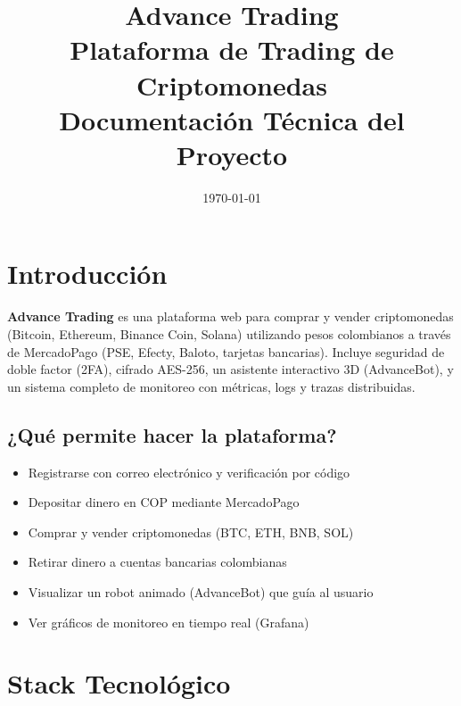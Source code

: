 \documentclass[12pt,oneside]{article}
\title{\color{titlepurple}\Huge\textbf{Advance Trading} \\[0.5cm]
\Large Plataforma de Trading de Criptomonedas \\[0.3cm]
\small Documentación Técnica del Proyecto}
\author{}
\date{\today}
\begin{document}
\maketitle
\thispagestyle{empty}
\newpage

\tableofcontents
\newpage

\section{Introducción}

\textbf{Advance Trading} es una plataforma web para comprar y vender criptomonedas (Bitcoin, Ethereum, Binance Coin, Solana) utilizando pesos colombianos a través de MercadoPago (PSE, Efecty, Baloto, tarjetas bancarias). Incluye seguridad de doble factor (2FA), cifrado AES-256, un asistente interactivo 3D (AdvanceBot), y un sistema completo de monitoreo con métricas, logs y trazas distribuidas.

\subsection{¿Qué permite hacer la plataforma?}

\begin{itemize}
    \item Registrarse con correo electrónico y verificación por código
    \item Depositar dinero en COP mediante MercadoPago
    \item Comprar y vender criptomonedas (BTC, ETH, BNB, SOL)
    \item Retirar dinero a cuentas bancarias colombianas
    \item Visualizar un robot animado (AdvanceBot) que guía al usuario
    \item Ver gráficos de monitoreo en tiempo real (Grafana)
\end{itemize}

\section{Stack Tecnológico}
\end{document}
